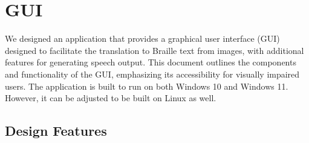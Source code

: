 
\setcounter{figure}{0}
\renewcommand{\thefigure}{8.\arabic{figure}}
\section{GUI}
 We designed an application that provides a graphical user interface (GUI) designed to facilitate the translation to Braille text from images, with additional features for generating speech output. This document outlines the components and functionality of the GUI, emphasizing its accessibility for visually impaired users. The application is built to run on both Windows 10 and Windows 11. However, it can be adjusted to be built on Linux as well.

\subsection{Design Features}



